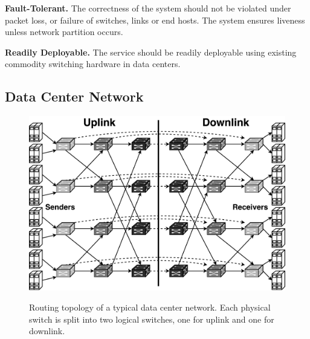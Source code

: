 \textbf{Fault-Tolerant.}
The correctness of the system should not be violated under packet loss, or failure of switches, links or end hosts.
The system ensures liveness unless network partition occurs.


\textbf{Readily Deployable.}
The service should be readily deployable using existing commodity switching hardware in data centers.


\subsection{Data Center Network}
\label{sec:dcn}




\begin{figure}[t]
\centering
{\includegraphics[width=.48\textwidth]{images/dcn_dag.pdf}}
\caption{
	Routing topology of a typical data center network.
	Each physical switch is split into two logical switches, one for uplink and one for downlink.
}
\label{fig:dcn}
\vspace{-1.5em}
\end{figure}

